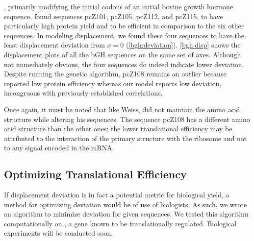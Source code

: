 \documentclass[12pt]{article}
\numberwithin{equation}{section}
\begin{document}
\citet{schoner:bgh}, primarily modifying the initial codons of an
initial bovine growth hormone sequence, found sequences pcZ101,
pcZ105, pcZ112, and pcZ115, to have particularly high protein yield
and to be efficient in comparison to the six other sequences. In
modeling displacement, we found these four sequences  to have the least
displacement deviation from $x = 0$
(\autoref{bgh:deviation}). \autoref{bgh:disp} shows the displacement
plots of all the bGH sequences on the same set of axes. Although not
immediately obvious, the four sequences do indeed indicate lower
deviation. Despite running the genetic algorithm, pcZ108 remains an
outlier because \citeauthor{schoner:bgh} reported low protein
efficiency whereas our model reports low deviation, incongruous with
previously established correlations.

Once again, it must be noted that like Weiss, \citeauthor{schoner:bgh}
did not maintain the amino acid structure while altering his sequences.
The sequence pcZ108 has a different amino acid structure than the other
ones; the lower translational efficiency may be attributed to the interaction
of the primary structure with the ribosome and not to any signal encoded
in the mRNA.

\subsection{Optimizing Translational Efficiency}

If displacement deviation is in fact a potential metric for biological yield,
a method for optimizing deviation would be of use of biologists.  As such,
we wrote an algorithm to minimize deviation for given sequences.
We tested this algorithm computationally on \rpoS, a gene known to
be translationally regulated.  Biological experiments will be
conducted soon.

\end{document}
